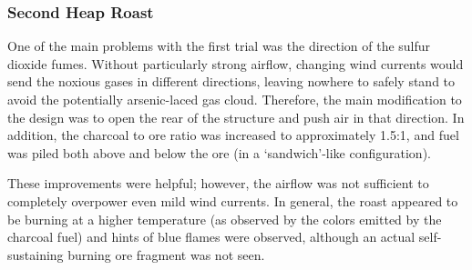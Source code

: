 \subsubsection{Second Heap Roast}

One of the main problems with the first trial was the direction of the sulfur
dioxide fumes.  Without particularly strong airflow, changing wind currents
would send the noxious gases in different directions, leaving nowhere to safely
stand to avoid the potentially arsenic-laced gas cloud.  Therefore, the main
modification to the design was to open the rear of the structure and push air in
that direction.  In addition, the charcoal to ore ratio was increased to
approximately 1.5:1, and fuel was piled both above and below the ore (in a
`sandwich'-like configuration).

These improvements were helpful; however, the airflow was not sufficient to
completely overpower even mild wind currents.  In general, the roast appeared to
be burning at a higher temperature (as observed by the colors emitted by the
charcoal fuel) and hints of blue flames were observed, although an actual
self-sustaining burning ore fragment was not seen.
